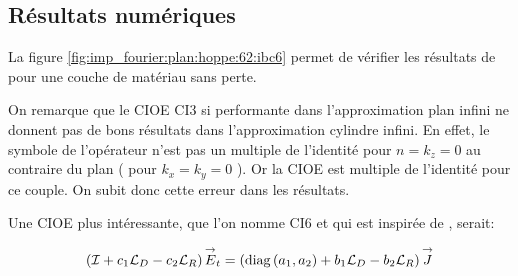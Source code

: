   \subsection{Résultats numériques}

    La figure \ref{fig:imp_fourier:plan:hoppe:62:ibc6} permet de vérifier les résultats de \cite[p.~62]{hoppe_impedance_1995} pour une couche de matériau sans perte.


    On remarque que le CIOE CI3 si performante dans l'approximation plan infini ne donnent pas de bons résultats dans l’approximation cylindre infini. 
    En effet, le symbole de l'opérateur n'est pas un multiple de l'identité pour \(n=k_z=0\) au contraire du plan ( pour \(k_x=k_y=0\) ). 
    Or la CIOE est multiple de l'identité pour ce couple. 
    On subit donc cette erreur dans les résultats. 

    Une CIOE plus intéressante, que l'on nomme CI6 et qui est inspirée de \cite[p.~60]{hoppe_impedance_1995}, serait:

    \begin{equation}
      \left({\mathcal{I}} + c_1{\mathcal{L}_D} -c_2{\mathcal{L}_R}\right){\overset{\rightarrow}{E}}_t = \left(\operatorname{diag}\left(a_1,a_2\right) + b_1{\mathcal{L}_D} - b_2 {\mathcal{L}_R} \right){\overset{\rightarrow}{J}}
    \end{equation}

